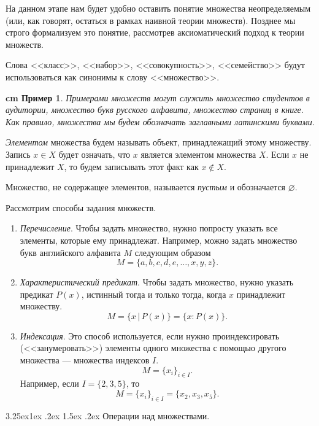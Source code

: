 \documentclass[12pt, russian]{article}
\makeatletter
\renewcommand\subsubsection{\@startsection{subsubsection}{3}{\parindent}%
	{3.25ex\@plus 1ex \@minus .2ex}%
	{1.5ex \@plus .2ex}%
	{\normalfont\large\bfseries}}
\newtheorem{example}{\hskip 0.5 cm Пример}%
\makeatother
\begin{document}
На данном этапе нам будет удобно оставить понятие множества неопределяемым (или, как говорят, остаться в рамках наивной теории множеств). Позднее мы строго формализуем это понятие, рассмотрев аксиоматический подход к теории множеств.

Слова <<класс>>, <<набор>>, <<совокупность>>, <<семейство>> будут использоваться как синонимы к слову <<множество>>.

\begin{example}
	Примерами множеств могут служить множество студентов в аудитории,  множество букв русского алфавита, множество страниц в книге. Как правило, множества мы будем обозначать заглавными латинскими буквами.
\end{example}

\textit{Элементом} множества будем называть объект, принадлежащий этому множеству. Запись $x \in X$ будет означать, что $x$ является элементом множества $X$. Если $x$ не принадлежит $X$, то будем записывать этот факт как $x \notin X$.

Множество, не содержащее элементов, называется \textit{пустым} и обозначается $\varnothing$.

Рассмотрим способы задания множеств.

\begin{enumerate}
	\item \textit{Перечисление}. Чтобы задать множество, нужно попросту указать все элементы, которые ему принадлежат. Например, можно задать множество букв английского алфавита $M$ следующим образом
	$$
	M = \{ a, b, c, d, e, \ldots, x, y, z \}.
	$$

	\item \textit{Характеристический предикат}. Чтобы задать множество, нужно указать предикат $P(x)$, истинный тогда и только тогда, когда $x$ принадлежит множеству.
	$$
	M = \{ x \, | \,  P(x)\} = \{ x: P(x)\}.
	$$

	\item \textit{Индексация}. Это способ используется, если нужно проиндексировать (<<занумеровать>>) элементы одного множества с помощью другого множества --- множества индексов $I$. 
	$$
	M = \{ x_i \}_{i \in I}.
	$$
	Например, если $I=\{2,3,5\}$, то
	$$
	M = \{ x_i \}_{i \in I} = \{ x_2, x_3, x_5 \}.
	$$
\end{enumerate}




\subsubsection{Операции над множествами.}
\end{document}
